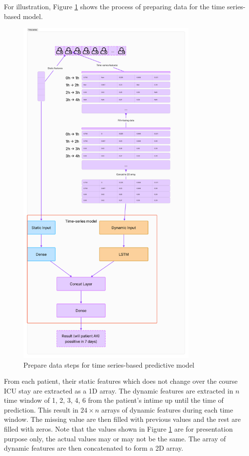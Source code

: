 \documentclass[../main.tex]{subfiles}
\begin{document}
For illustration, Figure \ref{fig:time-series-steps} shows the process of preparing data for the time series-based model.

\begin{figure}[h]
    \centering
    \includegraphics[width=0.8\textwidth]{Figure/time-series-steps.png}
    \caption{Prepare data steps for time series-based predictive model}
    \label{fig:time-series-steps}
\end{figure}

From each patient, their static features which does not change over the course ICU stay are extracted as a 1D array.
The dynamic features are extracted in $n$ time window of 1, 2, 3, 4, 6 from the patient's intime up until the time of prediction.
This result in $24 \times n$ arrays of dynamic features during each time window.
The missing value are then filled with previous values and the rest are filled with zeros.
Note that the values shown in Figure \ref{fig:time-series-steps} are for presentation purpose only, the actual values may or may not be the same.
The array of dynamic features are then concatenated to form a 2D array.
\end{document}
